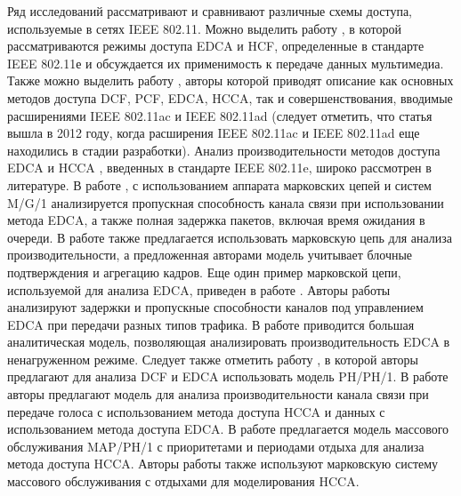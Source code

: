 
Ряд исследований рассматривают и сравнивают различные схемы доступа, используемые в сетях IEEE 802.11. Можно выделить работу \cite{Gao2005}, в которой рассматриваются режимы доступа EDCA и HCF, определенные в стандарте IEEE 802.11е и обсуждается их применимость к передаче данных мультимедиа. Также можно выделить работу \cite{Charfi2012}, авторы которой приводят описание как основных методов доступа DCF, PCF, EDCA, HCCA, так и совершенствования, вводимые расширениями IEEE 802.11ac и IEEE 802.11ad (следует отметить, что статья вышла в 2012 году, когда расширения IEEE 802.11ac и IEEE 802.11ad еще находились в стадии разработки). Анализ производительности методов доступа EDCA \cite{Engelstad2006, Hazra2011, Kong2004, Liu2007, Inan2009, Misic2012, YanfengZhu2006} и HCCA \cite{Harsha2006, Ghazizadeh2009, Rashd2006}, введенных в стандарте IEEE 802.11e, широко рассмотрен в литературе. В работе \cite{Engelstad2006}, с использованием аппарата марковских цепей и систем M/G/1 анализируется пропускная способность канала связи при использовании метода EDCA, а также полная задержка пакетов, включая время ожидания в очереди. В работе \cite{Hazra2011} также предлагается использовать марковскую цепь для анализа производительности, а предложенная авторами модель учитывает блочные подтверждения и агрегацию кадров. Еще один пример марковской цепи, используемой для анализа EDCA, приведен в работе \cite{Kong2004}. Авторы работы \cite{Liu2007} анализируют задержки и пропускные способности каналов под управлением EDCA при передачи разных типов трафика. В работе \cite{Misic2012} приводится большая аналитическая модель, позволяющая анализировать производительность EDCA в ненагруженном режиме. Следует также отметить работу \cite{YanfengZhu2006}, в которой авторы предлагают для анализа DCF и EDCA использовать модель PH/PH/1. В работе \cite{Harsha2006} авторы предлагают модель для анализа производительности канала связи при передаче голоса с использованием метода доступа HCCA и данных с использованием метода доступа EDCA. В работе \cite{Ghazizadeh2009} предлагается модель массового обслуживания MAP/PH/1 с приоритетами и периодами отдыха для анализа метода доступа HCCA.  Авторы работы \cite{Rashd2006} также используют марковскую систему массового обслуживания с отдыхами для моделирования HCCA.

